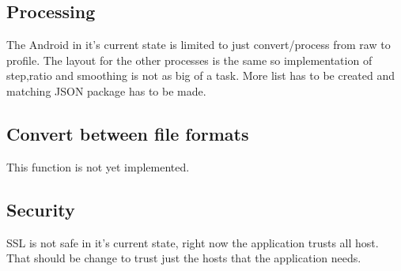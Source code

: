 
\subsection{Processing}
The Android in it's current state is limited to just convert/process from raw to profile. The layout for the other processes is the same so implementation of step,ratio and smoothing is not as big of a task. More list has to be created and matching JSON package has to be made. 

\subsection{Convert between file formats}
This function is not yet implemented. 

\subsection{Security}
SSL is not safe in it's current state, right now the application trusts all host. That should be change to trust just the hosts that the application needs.


